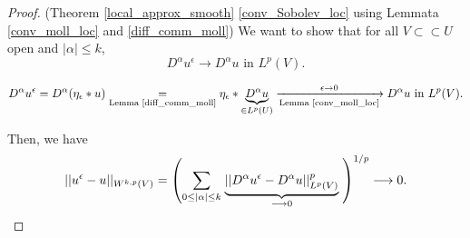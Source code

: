 \documentclass[12pt]{article}
\theoremstyle{definition}
\begin{document}
\begin{proof}
(Theorem \ref{local_approx_smooth} \ref{conv_Sobolev_loc} using Lemmata \ref{conv_moll_loc} and \ref{diff_comm_moll}) We want to show that for all $V\subset\subset U$ open and $|\alpha|\leq k$,
\[D^{\alpha}u^{\epsilon}\longrightarrow D^{\alpha}u\text{ in }L^p(V).\]

\[D^{\alpha}u^{\epsilon}=D^{\alpha}(\eta_{\epsilon}*u)\underset{\text{Lemma \ref{diff_comm_moll}}}{=}\eta_{\epsilon}*\underbrace{D^{\alpha}u}_{\in L^p(U)}\xrightarrow[\text{Lemma \ref{conv_moll_loc}}]{\epsilon\to0}D^{\alpha}u\text{ in }L^p(V).\]

Then, we have
\[||u^{\epsilon}-u||_{W^{k,p}(V)}=\left(\sum_{0\leq|\alpha|\leq k}\right.\underbrace{||D^{\alpha}u^{\epsilon}-D^{\alpha}u||_{L^p(V)}^p}_{\longrightarrow0}\left.\vphantom{\sum_{0\leq|\alpha|\leq k}}\right)^{1/p}\longrightarrow0.\]
\end{proof}
\end{document}
